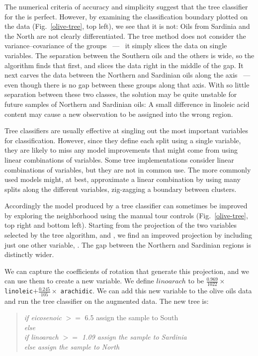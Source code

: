 The numerical criteria of accuracy and simplicity suggest that the
tree classifier for the  is perfect. However, by
examining the classification boundary plotted on the data
(Fig.~\ref{olive-tree}, top left), we see that it is not: Oils from
Sardinia and the North are not clearly differentiated. The tree method
does not consider the variance--covariance of the groups ~---~ it simply
slices the data on single variables.  The separation between the
Southern oils and the others is wide, so the algorithm finds that
first, and slices the data right in the middle of the gap.  It next
carves the data between the Northern and Sardinian oils along the
 axis ~---~ even though there is no gap between these
groups along that axis.  With so little separation between these two
classes, the solution may be quite unstable for future samples of
Northern and Sardinian oils: A small difference in linoleic acid
content may cause a new observation to be assigned into the wrong
region.

Tree classifiers are usually effective at singling out the most
important variables for classification.  However, since they define
each split using a single variable, they are likely to miss any model
improvements that might come from using linear combinations of
variables.  Some tree implementations consider linear
combinations of variables, but they are not in common use.  The more
commonly used models might, at best, approximate a linear combination
by using many splits along the different variables, zig-zagging a
boundary between clusters.

Accordingly the model produced by a tree classifier can sometimes be
improved by exploring the neighborhood using the manual tour controls
 (Fig.~\ref{olive-tree}, top right and bottom
left). Starting from the projection of the two variables selected by
the tree algorithm,
 and , we find an improved projection by
including just one other variable, .  The gap between
the Northern and Sardinian regions is distinctly wider.

We can capture the coefficients of rotation that generate this
projection, and we can use them to create a new variable.  We define
$linoarach$ to be $ \frac{0.969}{1022}\times$ {\tt linoleic}$ +
\frac{0.245}{105} \times$ {\tt arachidic}.  We can add this new
variable to the olive oils data and run the tree classifier on the
augmented data.  The new tree is:

\begin{quote}
\begin{tabbing}
\= {\em if eicosenoic} $>=$ {6.5  assign the sample to South} \\
\> {\em else}\\
\> \hspace{0.2in}\= {\em  if linoarach $>=$ 1.09 assign the sample to Sardinia} \\
\>\> {\em else                assign the sample to North}
\end{tabbing}
\end{quote}

